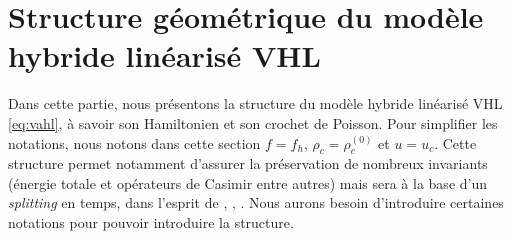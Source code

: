 
\section{Structure géométrique du modèle hybride linéarisé VHL}
\label{s:geom}


Dans cette partie, nous présentons la structure du modèle hybride linéarisé VHL \eqref{eq:vahl}, à savoir son Hamiltonien et son crochet de Poisson. Pour simplifier les notations, nous notons dans cette section $f=f_h$, $\rho_c=\rho_c^{(0)}$ et $u=u_c$. Cette structure permet notamment d'assurer la préservation de nombreux invariants (énergie totale et opérateurs de Casimir entre autres) mais sera à la base d'un \emph{splitting} en temps, dans l'esprit de \cite{Crouseilles:2015}, \cite{Casas:2017}, \cite{Kraus:2017} \cite{Li:2020}. Nous aurons besoin d'introduire certaines notations pour pouvoir introduire la structure.

